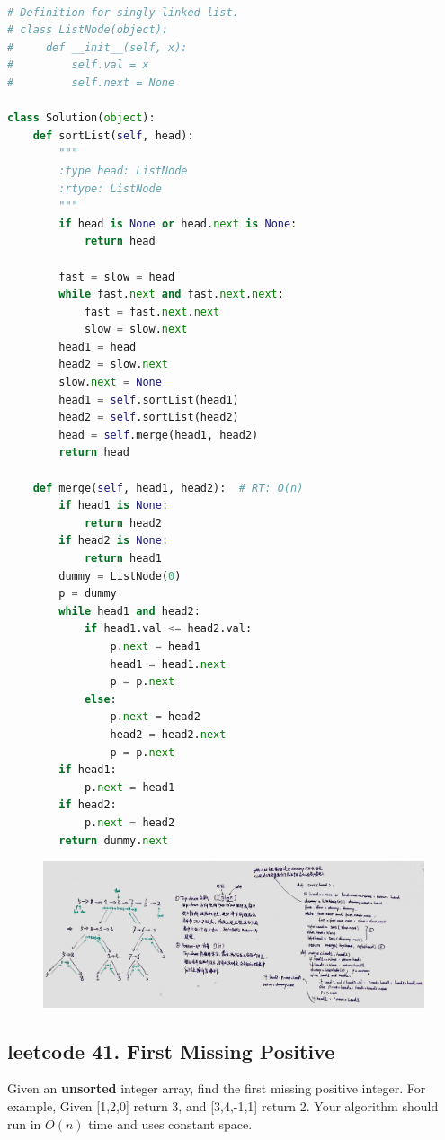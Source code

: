 \documentclass[a4paper,10pt]{article}
\begin{document}
\begin{lstlisting}[language=Python, caption=Problem148. Sort List]

# Definition for singly-linked list.
# class ListNode(object):
#     def __init__(self, x):
#         self.val = x
#         self.next = None

class Solution(object):
    def sortList(self, head):
        """
        :type head: ListNode
        :rtype: ListNode
        """
        if head is None or head.next is None:
            return head

        fast = slow = head
        while fast.next and fast.next.next:
            fast = fast.next.next
            slow = slow.next
        head1 = head
        head2 = slow.next
        slow.next = None
        head1 = self.sortList(head1)
        head2 = self.sortList(head2)
        head = self.merge(head1, head2)
        return head

    def merge(self, head1, head2):  # RT: O(n)
        if head1 is None: 
            return head2
        if head2 is None: 
            return head1
        dummy = ListNode(0)
        p = dummy
        while head1 and head2:
            if head1.val <= head2.val:
                p.next = head1
                head1 = head1.next
                p = p.next
            else:
                p.next = head2
                head2 = head2.next
                p = p.next
        if head1:
            p.next = head1
        if head2:
            p.next = head2
        return dummy.next
\end{lstlisting}

\begin{figure}[h]
    \includegraphics[width=1\textwidth]{leetcode148.jpg}
    \centering\\
\end{figure}





\subsection{leetcode 41. First Missing Positive}
Given an \textbf{unsorted} integer array, find the first missing positive integer. For example, Given [1,2,0] return 3, and [3,4,-1,1] return 2. Your algorithm should run in $O(n)$ time and uses constant space. \\
\end{document}
